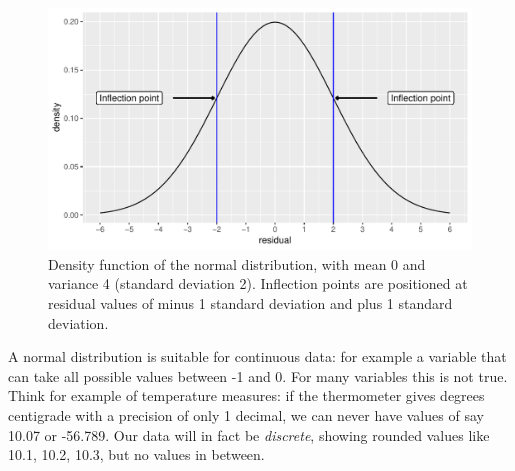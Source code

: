 \documentclass[]{book}\usepackage[]{graphicx}\usepackage[]{color}
\makeatletter
\def\maxwidth{ %
  \ifdim\Gin@nat@width>\linewidth
    \linewidth
  \else
    \Gin@nat@width
  \fi
}
\newenvironment{knitrout}{}{} %
\makeatother
\begin{document}
\begin{knitrout}
\color{fgcolor}\begin{figure}

{\centering \includegraphics[width=\maxwidth]{figure/gen_1-1} 

}

\caption[Density function of the normal distribution, with mean 0 and variance 4 (standard deviation 2)]{Density function of the normal distribution, with mean 0 and variance 4 (standard deviation 2). Inflection points are positioned at residual values of minus 1 standard deviation and plus 1 standard deviation.}\label{fig:gen_1}
\end{figure}


\end{knitrout}
% 
A normal distribution is suitable for continuous data: for example a variable that can take all possible values between -1 and 0. For many variables this is not true. Think for example of temperature measures: if the thermometer gives degrees centigrade with a precision of only 1 decimal, we can never have values of say 10.07 or -56.789. Our data will in fact be \textit{discrete}, showing rounded values like 10.1, 10.2, 10.3, but no values in between.
\end{document}
